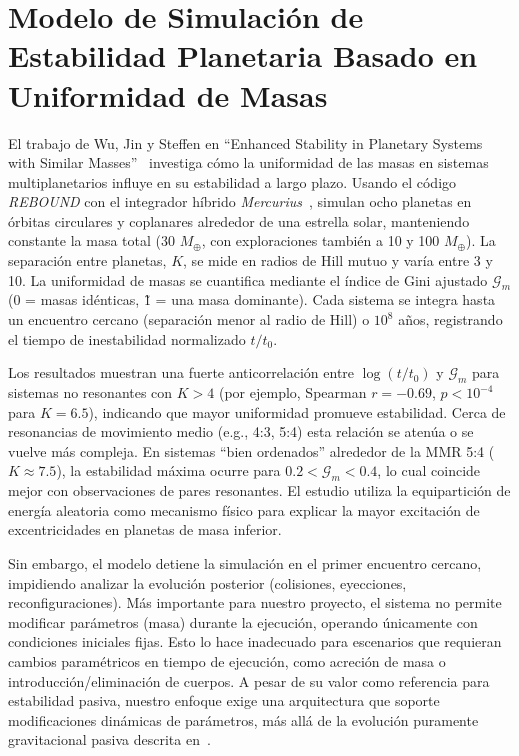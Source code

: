 \section[Modelo de Estabilidad Planetaria]{Modelo de Simulación de Estabilidad Planetaria Basado en Uniformidad de Masas}%
\label{sec:state_of_the_art_10}

El trabajo de Wu, Jin y Steffen en “Enhanced Stability in Planetary Systems with Similar Masses”~\cite{Wu2025} investiga cómo la uniformidad de las masas en sistemas multiplanetarios influye en su estabilidad a largo plazo. Usando el código \textit{REBOUND} con el integrador híbrido \textit{Mercurius}~\cite{Rein2012}\cite{rein2019}, simulan ocho planetas en órbitas circulares y coplanares alrededor de una estrella solar, manteniendo constante la masa total (30 $M_{\oplus}$, con exploraciones también a 10 y 100 $M_{\oplus}$). La separación entre planetas, $K$, se mide en radios de Hill mutuo y varía entre 3 y 10. La uniformidad de masas se cuantifica mediante el índice de Gini ajustado $\mathcal{G}_m$ (0 = masas idénticas, \~1 = una masa dominante). Cada sistema se integra hasta un encuentro cercano (separación menor al radio de Hill) o $10^8$ años, registrando el tiempo de inestabilidad normalizado $t/t_0$.

Los resultados muestran una fuerte anticorrelación entre $\log(t/t_0)$ y $\mathcal{G}_m$ para sistemas no resonantes con $K>4$ (por ejemplo, Spearman $r=-0.69$, $p<10^{-4}$ para $K=6.5$), indicando que mayor uniformidad promueve estabilidad. Cerca de resonancias de movimiento medio (e.g., 4:3, 5:4) esta relación se atenúa o se vuelve más compleja. En sistemas “bien ordenados” alrededor de la MMR 5:4 ($K\approx7.5$), la estabilidad máxima ocurre para $0.2<\mathcal{G}_m<0.4$, lo cual coincide mejor con observaciones de pares resonantes. El estudio utiliza la equipartición de energía aleatoria como mecanismo físico para explicar la mayor excitación de excentricidades en planetas de masa inferior.

Sin embargo, el modelo detiene la simulación en el primer encuentro cercano, impidiendo analizar la evolución posterior (colisiones, eyecciones, reconfiguraciones). Más importante para nuestro proyecto, el sistema no permite modificar parámetros (masa) durante la ejecución, operando únicamente con condiciones iniciales fijas. Esto lo hace inadecuado para escenarios que requieran cambios paramétricos en tiempo de ejecución, como acreción de masa o introducción/eliminación de cuerpos. A pesar de su valor como referencia para estabilidad pasiva, nuestro enfoque exige una arquitectura que soporte modificaciones dinámicas de parámetros, más allá de la evolución puramente gravitacional pasiva descrita en~\cite{Wu2025}.

